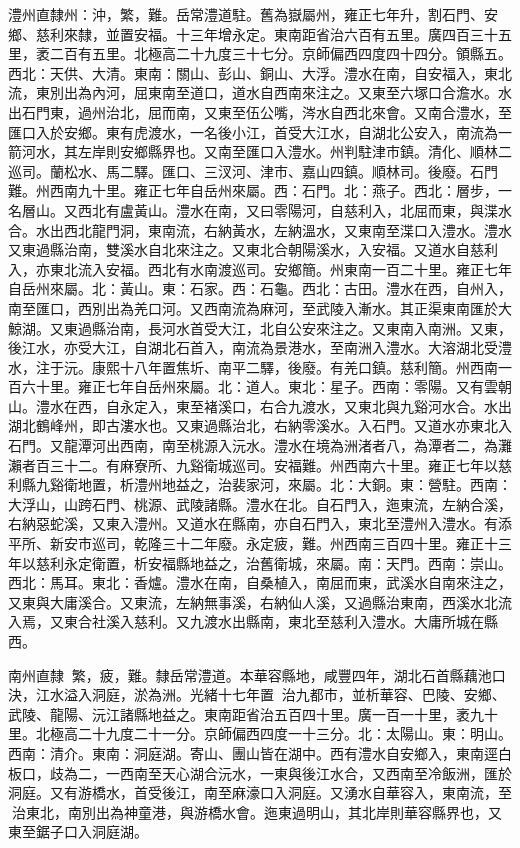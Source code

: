 \begin{pinyinscope}
澧州直隸州：沖，繁，難。岳常澧道駐。舊為嶽屬州，雍正七年升，割石門、安鄉、慈利來隸，並置安福。十三年增永定。東南距省治六百有五里。廣四百三十五里，袤二百有五里。北極高二十九度三十七分。京師偏西四度四十四分。領縣五。西北：天供、大清。東南：關山、彭山、銅山、大浮。澧水在南，自安福入，東北流，東別出為內河，屈東南至道口，道水自西南來注之。又東至六塚口合澹水。水出石門東，過州治北，屈而南，又東至伍公嘴，涔水自西北來會。又南合澧水，至匯口入於安鄉。東有虎渡水，一名後小江，首受大江水，自湖北公安入，南流為一箭河水，其左岸則安鄉縣界也。又南至匯口入澧水。州判駐津市鎮。清化、順林二巡司。蘭松水、馬二驛。匯口、三汊河、津市、嘉山四鎮。順林司。後廢。石門難。州西南九十里。雍正七年自岳州來屬。西：石門。北：燕子。西北：層步，一名層山。又西北有盧黃山。澧水在南，又曰零陽河，自慈利入，北屈而東，與渫水合。水出西北龍門洞，東南流，右納黃水，左納溫水，又東南至渫口入澧水。澧水又東過縣治南，雙溪水自北來注之。又東北合朝陽溪水，入安福。又道水自慈利入，亦東北流入安福。西北有水南渡巡司。安鄉簡。州東南一百二十里。雍正七年自岳州來屬。北：黃山。東：石家。西：石龜。西北：古田。澧水在西，自州入，南至匯口，西別出為羌口河。又西南流為麻河，至武陵入漸水。其正渠東南匯於大鯨湖。又東過縣治南，長河水首受大江，北自公安來注之。又東南入南洲。又東，後江水，亦受大江，自湖北石首入，南流為景港水，至南洲入澧水。大溶湖北受澧水，注于沅。康熙十八年置焦圻、南平二驛，後廢。有羌口鎮。慈利簡。州西南一百六十里。雍正七年自岳州來屬。北：道人。東北：星子。西南：零陽。又有雲朝山。澧水在西，自永定入，東至褚溪口，右合九渡水，又東北與九谿河水合。水出湖北鶴峰州，即古漊水也。又東過縣治北，右納零溪水。入石門。又道水亦東北入石門。又龍潭河出西南，南至桃源入沅水。澧水在境為洲渚者八，為潭者二，為灘瀨者百三十二。有麻寮所、九谿衛城巡司。安福難。州西南六十里。雍正七年以慈利縣九谿衛地置，析澧州地益之，治裴家河，來屬。北：大銅。東：營駐。西南：大浮山，山跨石門、桃源、武陵諸縣。澧水在北。自石門入，迤東流，左納合溪，右納惡蛇溪，又東入澧州。又道水在縣南，亦自石門入，東北至澧州入澧水。有添平所、新安市巡司，乾隆三十二年廢。永定疲，難。州西南三百四十里。雍正十三年以慈利永定衛置，析安福縣地益之，治舊衛城，來屬。南：天門。西南：崇山。西北：馬耳。東北：香爐。澧水在南，自桑植入，南屈而東，武溪水自南來注之，又東與大庸溪合。又東流，左納無事溪，右納仙人溪，又過縣治東南，西溪水北流入焉，又東合社溪入慈利。又九渡水出縣南，東北至慈利入澧水。大庸所城在縣西。

南州直隸：繁，疲，難。隸岳常澧道。本華容縣地，咸豐四年，湖北石首縣藕池口決，江水溢入洞庭，淤為洲。光緒十七年置，治九都市，並析華容、巴陵、安鄉、武陵、龍陽、沅江諸縣地益之。東南距省治五百四十里。廣一百一十里，袤九十里。北極高二十九度二十一分。京師偏西四度一十三分。北：太陽山。東：明山。西南：清介。東南：洞庭湖。寄山、團山皆在湖中。西有澧水自安鄉入，東南逕白板口，歧為二，一西南至天心湖合沅水，一東與後江水合，又西南至冷飯洲，匯於洞庭。又有游橋水，首受後江，南至麻濠口入洞庭。又湧水自華容入，東南流，至治東北，南別出為神童港，與游橋水會。迤東過明山，其北岸則華容縣界也，又東至鋸子口入洞庭湖。


\end{pinyinscope}
